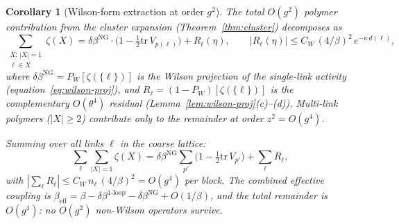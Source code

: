 \documentclass[11pt]{article}
\newtheorem{corollary}[theorem]{Corollary}
\theoremstyle{definition}
\newcommand{\tr}{\mathrm{tr}}
\begin{document}
\begin{corollary}[Wilson-form extraction at order $g^2$]%
\label{cor:wilson-extraction}
The total $O(g^2)$ polymer contribution from the cluster expansion
(Theorem~\ref{thm:cluster}) decomposes as
\begin{equation}\label{eq:wilson-extract}
\sum_{\substack{X:\,|X|=1\\\ell\in X}}\zeta(X)
=\delta\beta^{\mathrm{NG}}\cdot
\bigl(1-\tfrac{1}{2}\tr\,V_{p(\ell)}\bigr)
+R_\ell(\eta),
\qquad
|R_\ell(\eta)|\le C_W\,(4/\beta)^2\,e^{-\kappa\,d(\ell)},
\end{equation}
where $\delta\beta^{\mathrm{NG}}=P_W[\zeta(\{\ell\})]$ is the
Wilson projection of the single-link activity
(equation~\eqref{eq:wilson-proj}), and
$R_\ell=(1-P_W)[\zeta(\{\ell\})]$ is the complementary
$O(\theta^4)$ residual (Lemma~\ref{lem:wilson-proj}(c)--(d)).
Multi-link polymers ($|X|\ge 2$) contribute only to the
remainder at order $z^2=O(g^4)$.

Summing over all links $\ell$ in the coarse lattice:
\begin{equation}
\sum_\ell\sum_{|X|=1}\zeta(X)
=\delta\beta^{\mathrm{NG}}\sum_{p'}
\bigl(1-\tfrac{1}{2}\tr\,V_{p'}\bigr)
+\sum_\ell R_\ell,
\end{equation}
with $|\sum_\ell R_\ell|\le C_W\,n_\ell\,(4/\beta)^2=O(g^4)$
per block.  The combined effective coupling is
$\beta_{\mathrm{eff}}=\beta-\delta\beta^{1\text{-loop}}
-\delta\beta^{\mathrm{NG}}+O(1/\beta)$,
and the total remainder is $O(g^4)$: no $O(g^2)$
non-Wilson operators survive.
\end{corollary}
\end{document}
